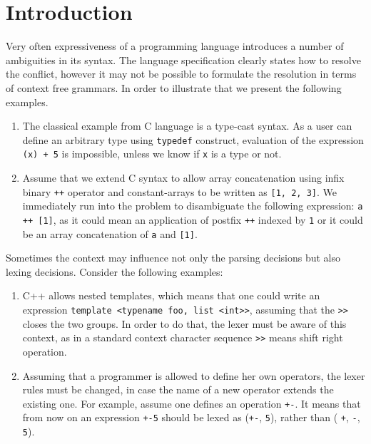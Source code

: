 \section{\label{sec:intro}Introduction}

Very often expressiveness of a programming language introduces a number of
ambiguities in its syntax.  The language specification clearly states how to
resolve the conflict, however it may not be possible to formulate the
resolution in terms of context free grammars.  In order to illustrate that we
present the following examples.

\begin{enumerate}
    \item The classical example from C language is a type-cast 
          syntax.  As a user can define an arbitrary type using
          \verb|typedef| construct, evaluation of the expression
          \verb|(x) + 5| is impossible, unless we know if
          \verb|x| is a type or not.
    \item Assume that we extend C syntax to allow array 
          concatenation using infix binary \verb|++| operator and
          constant-arrays to be written as \verb|[1, 2, 3]|.
          We immediately run into the problem to disambiguate the 
          following expression: \verb|a ++ [1]|, as it could mean
          an application of postfix \verb|++| indexed by \verb|1|
          or it could be an array concatenation of \verb|a| and 
          \verb|[1]|.
\end{enumerate}

\noindent
Sometimes the context may influence not only the parsing decisions but 
also lexing decisions.  Consider the following examples:
\begin{enumerate}
    \item C++ allows nested templates, which means that one could
          write an expression \verb|template <typename foo, list <int>>|, 
          assuming that the \verb|>>| closes the two groups.  In
          order to do that, the lexer must be aware of this context,
          as in a standard context character sequence \verb|>>| means
          shift right operation.
    \item Assuming that a programmer is allowed to define her own 
          operators, the lexer rules must be changed, in case 
          the name of a new operator extends the existing one.  For
          example, assume one defines an operation \verb|+-|.
          It means that from now on an expression \verb|+-5| should
          be lexed as (\verb|+-|, \verb|5|), rather than (%
          \verb|+|, \verb|-|, \verb|5|).
\end{enumerate}

